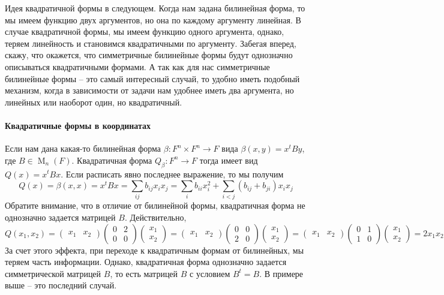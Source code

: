 Идея квадратичной формы в следующем.
Когда нам задана билинейная форма, то мы имеем функцию двух аргументов, но она по каждому аргументу линейная.
В случае квадратичной формы, мы имеем функцию одного аргумента, однако, теряем линейность и становимся квадратичными по аргументу.
Забегая вперед, скажу, что окажется, что симметричные билинейные формы будут однозначно описываться квадратичными формами.
А так как для нас симметричные билинейные формы -- это самый интересный случай, то удобно иметь подобный механизм, когда в зависимости от задачи нам удобнее иметь два аргумента, но линейных или наоборот один, но квадратичный.


\paragraph{Квадратичные формы в координатах}

Если нам дана какая-то билинейная форма $\beta \colon F^n\times F^n\to F$ вида $\beta(x, y) = x^t B y$, где $B\in \operatorname{M}_n(F)$.
Квадратичная форма $Q_\beta\colon F^n\to F$ тогда имеет вид $Q(x) = x^t B x$.
Если расписать явно последнее выражение, то мы получим
\[
Q(x) = \beta(x,x) = x^t B x = \sum_{ij} b_{ij}x_ix_j = \sum_{i}b_{ii}x_i^2+ \sum_{i<j}(b_{ij} + b_{ji})x_i x_j
\]
Обратите внимание, что в отличие от билинейной формы, квадратичная форма не однозначно задается матрицей $B$.
Действительно, 
\[
Q(x_1,x_2) = 
\begin{pmatrix}
{x_1}&{x_2}
\end{pmatrix}
\begin{pmatrix}
{0}&{2}\\
{0}&{0}
\end{pmatrix}
\begin{pmatrix}
{x_1}\\{x_2}
\end{pmatrix}=
\begin{pmatrix}
{x_1}&{x_2}
\end{pmatrix}
\begin{pmatrix}
{0}&{0}\\
{2}&{0}
\end{pmatrix}
\begin{pmatrix}
{x_1}\\{x_2}
\end{pmatrix}=
\begin{pmatrix}
{x_1}&{x_2}
\end{pmatrix}
\begin{pmatrix}
{0}&{1}\\
{1}&{0}
\end{pmatrix}
\begin{pmatrix}
{x_1}\\{x_2}
\end{pmatrix}
=2x_1x_2
\]
За счет этого эффекта, при переходе к квадратичным формам от билинейных, мы теряем часть информации.
Однако, квадратичная форма однозначно задается симметрической матрицей $B$, то есть матрицей $B$ с условием $B^t = B$.
В примере выше -- это последний случай.

